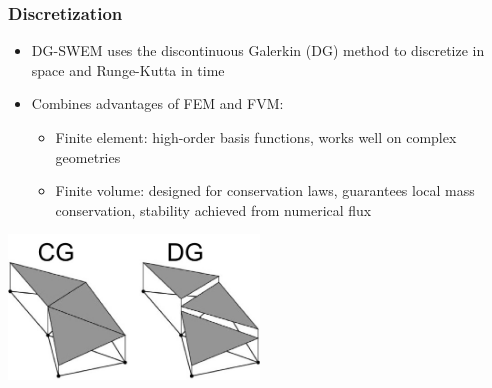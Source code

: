 \documentclass[10pt]{oden_beamer}
\begin{document}
\begin{frame}
  \frametitle{Discretization}
  \begin{itemize}
  \item DG-SWEM uses the discontinuous Galerkin (DG) method to discretize in space and Runge-Kutta in time
  \item Combines advantages of FEM and FVM:
    \begin{itemize}
    \item Finite element: high-order basis functions, works well on complex geometries
    \item Finite volume: designed for conservation laws, guarantees local mass conservation, stability achieved from numerical flux
    \end{itemize}
  \end{itemize}
  \centering
  \includegraphics[width=0.5\textwidth]{cgdg.jpg}
\end{frame}
\end{document}
